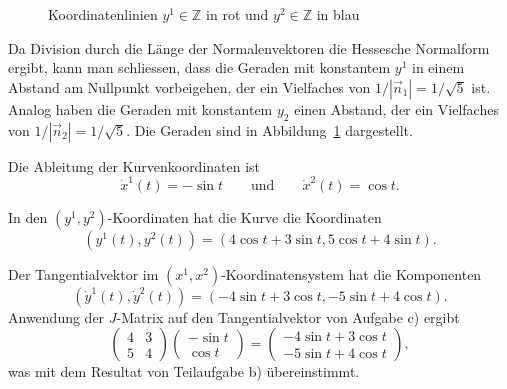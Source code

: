 \begin{loesung}
\begin{teilaufgaben}
\begin{figure}
\caption{Koordinatenlinien $y^1\in\mathbb{Z}$ in rot und 
$y^2\in\mathbb{Z}$ in blau
\label{buch:201:fig}}
\end{figure}
Da Division durch die Länge der Normalenvektoren die Hessesche
Normalform ergibt, kann man schliessen, dass die Geraden mit
konstantem $y^1$ in einem Abstand am Nullpunkt vorbeigehen, 
der ein Vielfaches von $1/|\vec{n}_1|=1/\sqrt{5}$ ist.
Analog haben die Geraden mit konstantem $y_2$ einen Abstand,
der ein Vielfaches von $1/|\vec{n}_2|=1/\sqrt{5}$.
Die Geraden sind in Abbildung~\ref{buch:201:fig} dargestellt.
\item
Die Ableitung der Kurvenkoordinaten ist
\[
\dot{x}^1(t) = -\sin t
\qquad\text{und}\qquad
\dot{x}^2(t) = \cos t.
\]
\item
In den $(y^1,y^2)$-Koordinaten hat die Kurve die Koordinaten
\[
(y^1(t), y^2(t))
=
(4\cos t+3\sin t, 5\cos t + 4\sin t).
\]
\item
Der Tangentialvektor im $(x^1,x^2)$-Koordinatensystem hat die
Komponenten
\[
(\dot{y}^1(t),\dot{y}^2(t))
=
(-4\sin t+3\cos t, -5\sin t + 4\cos t).
\]
Anwendung der $J$-Matrix auf den Tangentialvektor von Aufgabe c) ergibt
\[
\begin{pmatrix}
4 & 3 \\
5 & 4
\end{pmatrix}
\begin{pmatrix}
-\sin t\\
 \cos t
\end{pmatrix}
=
\begin{pmatrix}
-4\sin t + 3\cos t\\
-5\sin t + 4\cos t
\end{pmatrix},
\]
was mit dem Resultat von Teilaufgabe b) übereinstimmt.
\qedhere
\end{teilaufgaben}
\end{loesung}

